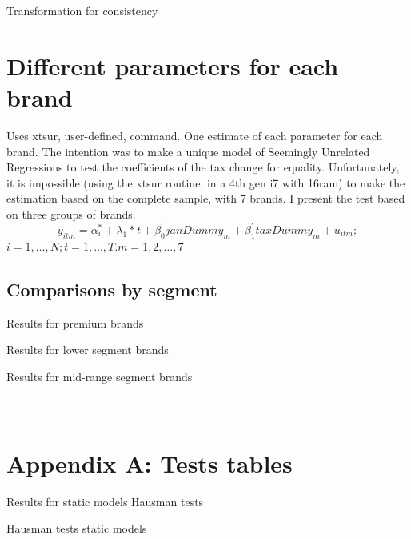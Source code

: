 \documentclass[]{article}
\begin{document}
	\begin{table}[ht]
		\centering
		\caption{Transformation for consistency \label{tab:xtDm}} 

	\end{table}



\section{Different parameters for each brand}
Uses xtsur, user-defined, command.
One estimate of each parameter for each brand. 
The intention was to make a unique model of Seemingly Unrelated Regressions to test the coefficients of the tax change for equality. 
Unfortunately, it is impossible (using the xtsur routine, in a 4th gen i7 with 16ram) to make the estimation based on the complete sample, with 7 brands. I present the test based on three groups of brands.
\begin{equation*} 
	y_{itm}  = \alpha_{i}^{*} + \lambda_{1}*t +\beta_{0}^{'}janDummy_{m} + \beta_{1}^{'}taxDummy_{m} + u_{itm}
	;  
\end{equation*}
$i  = 1,\ldots,N;  t=1,\ldots,T. m = 1,2,\ldots,7$

\subsection{Comparisons by segment}
Results for premium brands



Results for lower segment brands



Results for mid-range segment brands




\appendix
\section{\\Appendix A: Tests tables}

Results for static models Hausman tests

\begin{table}[ht]
	\centering
	
	\caption{Hausman tests static models \label{tab:AppHausmanStatic}} 
	
	
\end{table}
\end{document}
